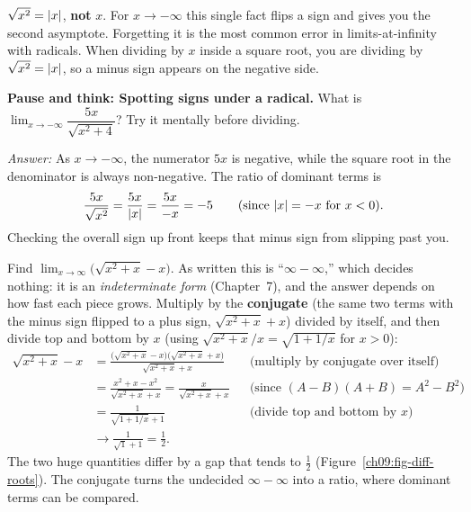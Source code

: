 \begin{trapbox}
$\sqrt{x^2}=\lvert x\rvert$, \textbf{not} $x$. For $x\to-\infty$ this single fact flips
a sign and gives you the second asymptote. Forgetting it is the most common
error in limits-at-infinity with radicals. When dividing by $x$ inside a square
root, you are dividing by $\sqrt{x^2}=\lvert x\rvert$, so a minus sign appears on
the negative side.
\end{trapbox}

\begin{recoverybox}
\textbf{Pause and think: Spotting signs under a radical.} What is
$\lim_{x\to-\infty} \dfrac{5x}{\sqrt{x^2+4}}$? Try it mentally before dividing.

\emph{Answer:} As $x\to-\infty$, the numerator $5x$ is negative, while the square
root in the denominator is always non-negative. The ratio of dominant terms is
\[
  \frac{5x}{\sqrt{x^2}} = \frac{5x}{\lvert x\rvert} = \frac{5x}{-x} = -5
  \qquad(\text{since } \lvert x\rvert=-x \text{ for } x<0).
\]
Checking the overall sign up front keeps that minus sign from slipping past you.
\end{recoverybox}

\begin{example}
\label{ch09:ex-diff-roots}
Find $\lim_{x\to\infty}\bigl(\sqrt{x^2+x}-x\bigr)$. As written this is
``$\infty-\infty$,'' which decides nothing: it is an \emph{indeterminate form}
(Chapter~7), and the answer depends on how fast each piece grows. Multiply by
the \textbf{conjugate} (the same two terms with the minus sign flipped to a
plus sign, $\sqrt{x^2+x}+x$) divided by itself, and then divide top and bottom
by $x$ (using $\sqrt{x^2+x}/x=\sqrt{1+1/x}$ for $x>0$):
\begin{align*}
\sqrt{x^2+x}-x
&= \frac{\bigl(\sqrt{x^2+x}-x\bigr)\bigl(\sqrt{x^2+x}+x\bigr)}{\sqrt{x^2+x}+x}
&&\text{(multiply by conjugate over itself)}\\
&= \frac{x^2+x-x^2}{\sqrt{x^2+x}+x}
= \frac{x}{\sqrt{x^2+x}+x}
&&\text{(since $(A-B)(A+B)=A^2-B^2$)}\\
&= \frac{1}{\sqrt{1+1/x}+1}
&&\text{(divide top and bottom by $x$)}\\
&\longrightarrow \frac{1}{\sqrt 1 + 1}=\frac12 .
\end{align*}
The two huge quantities differ by a gap that tends to $\tfrac12$
(Figure~\ref{ch09:fig-diff-roots}). The conjugate turns the undecided
$\infty-\infty$ into a ratio, where dominant terms can be compared.
\end{example}

